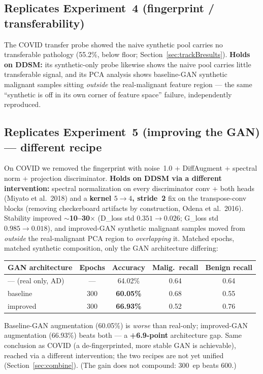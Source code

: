 \documentclass[11pt]{article}
\begin{document}
\subsection{Replicates Experiment~4 (fingerprint / transferability)}
The COVID transfer probe showed the naive synthetic pool carries no transferable
pathology (55.2\%, below floor; Section~\ref{sec:trackBresults}). \textbf{Holds on
DDSM:} its synthetic-only probe likewise shows the naive pool carries little
transferable signal, and its PCA analysis shows baseline-GAN synthetic malignant
samples sitting \emph{outside} the real-malignant feature region --- the same
``synthetic is off in its own corner of feature space'' failure, independently
reproduced.

\subsection{Replicates Experiment~5 (improving the GAN) --- different recipe}
\label{sec:ddsmgan}
On COVID we removed the fingerprint with noise~1.0 + DiffAugment + spectral norm +
projection discriminator. \textbf{Holds on DDSM via a different intervention:} spectral
normalization on every discriminator conv + both heads (Miyato et al.\ 2018) and a
\textbf{kernel $5\to4$, stride~2} fix on the transpose-conv blocks (removing
checkerboard artifacts by construction, Odena et al.\ 2016). Stability improved
\textbf{$\sim$10--30$\times$} (D\_loss std $0.351\to0.026$; G\_loss std
$0.985\to0.018$), and improved-GAN synthetic malignant samples moved from
\emph{outside} the real-malignant PCA region to \emph{overlapping} it. Matched epochs,
matched synthetic composition, only the GAN architecture differing:

\begin{table}[htbp]
\centering\small
\begin{tabular}{@{}lcccc@{}}
\toprule
\textbf{GAN architecture} & \textbf{Epochs} & \textbf{Accuracy} & \textbf{Malig.\ recall} & \textbf{Benign recall} \\
\midrule
--- (real only, AD) & --- & 64.02\% & 0.64 & 0.64 \\
baseline & 300 & \textbf{60.05\%} & 0.68 & 0.55 \\
improved & 300 & \textbf{66.93\%} & 0.52 & 0.76 \\
\bottomrule
\end{tabular}
\end{table}

\noindent Baseline-GAN augmentation (60.05\%) is \emph{worse} than real-only;
improved-GAN augmentation (66.93\%) beats both --- a \textbf{+6.9-point} architecture
gap. Same conclusion as COVID (a de-fingerprinted, more stable GAN is achievable),
reached via a different intervention; the two recipes are not yet unified
(Section~\ref{sec:combine}). (The gain does not compound: 300~ep beats 600.)
\end{document}

